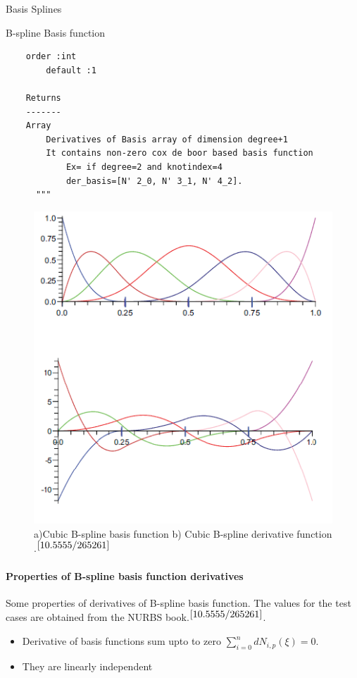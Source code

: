 \documentclass[a4paper,12pt,times]{article}
\begin{document}
\begin{section}{Basis Splines}
\begin{subsection}{B-spline Basis function}
\begin{lstlisting}
	order :int 
		default :1
		
    Returns
    -------
    Array 
        Derivatives of Basis array of dimension degree+1
        It contains non-zero cox de boor based basis function
            Ex= if degree=2 and knotindex=4 
            der_basis=[N' 2_0, N' 3_1, N' 4_2].
      """

\end{lstlisting}

\begin{figure}[h!]
\centering
\includegraphics[width=0.75\linewidth]{bspline_function_and_derivative_cubic.png}
\caption{a)Cubic B-spline basis function b) Cubic B-spline derivative function .$^{\cite{10.5555/265261}}$}
\label{fig:Cubic Bspline basis function and it's derivative}
\end{figure}

\paragraph{Properties of B-spline basis function derivatives}
Some properties of derivatives of B-spline basis function. The values for the test cases are obtained from the NURBS book.$^{\cite{10.5555/265261}}$.
 
\begin{itemize}
\item Derivative of basis functions sum upto to zero $\sum_{i=0}^{n}d N_{i, p}(\xi)=0$.

\item They are linearly independent


\end{itemize}
\end{subsection}
\end{section}
\end{document}
